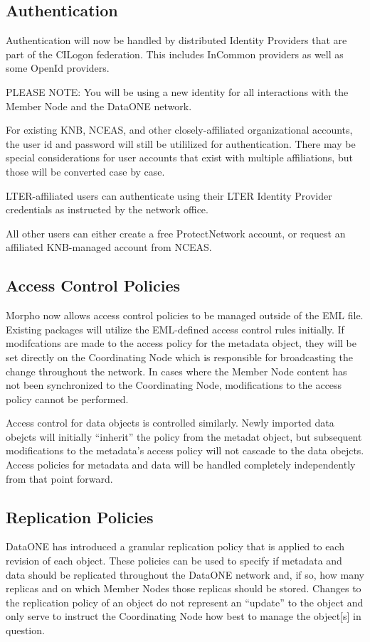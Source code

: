 \subsection{Authentication}

Authentication will now be handled by distributed Identity Providers 
that are part of the CILogon federation. This includes InCommon providers
as well as some OpenId providers.

PLEASE NOTE: You will be using a new identity for all interactions with 
the Member Node and the DataONE network.

For existing KNB, NCEAS, and other closely-affiliated organizational accounts, the user id 
and password will still be utililized for authentication. There may be special considerations 
for user accounts that exist with multiple affiliations, but those will be converted case by 
case.

LTER-affiliated users can authenticate using their LTER Identity Provider credentials
as instructed by the network office.

All other users can either create a free ProtectNetwork account, or request an affiliated 
KNB-managed account from NCEAS.

\subsection{Access Control Policies}

Morpho now allows access control policies to be managed outside of the EML
file. Existing packages will utilize the EML-defined access control rules initially.
If modifcations are made to the access policy for the metadata object, they will be set
directly on the Coordinating Node which is responsible for broadcasting the change
throughout the network. In cases where the Member Node content has not been synchronized
to the Coordinating Node, modifications to the access policy cannot be performed.

Access control for data objects is controlled similarly. Newly imported data obejcts
will initially ``inherit'' the policy from the metadat object, but subsequent modifications
to the metadata's access policy will not cascade to the data obejcts. Access policies for 
metadata and data will be handled completely independently from that point forward.

\subsection{Replication Policies}

DataONE has introduced a granular replication policy that is applied to each 
revision of each object. These policies can be used to specify if metadata and 
data should be replicated throughout the DataONE network and, if so, how many 
replicas and on which Member Nodes those replicas should be stored. 
Changes to the replication policy of an object do not represent an ``update'' to 
the object and only serve to instruct the Coordinating Node how best to 
manage the object[s] in question.
